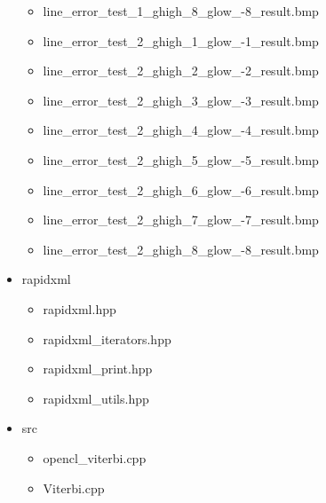 \documentclass[document.tex]{subfiles}
\begin{document}
\begin{itemize}
\begin{itemize}
        \item line\_error\_test\_1\_ghigh\_8\_glow\_-8\_result.bmp
        \item line\_error\_test\_2\_ghigh\_1\_glow\_-1\_result.bmp
        \item line\_error\_test\_2\_ghigh\_2\_glow\_-2\_result.bmp
        \item line\_error\_test\_2\_ghigh\_3\_glow\_-3\_result.bmp
        \item line\_error\_test\_2\_ghigh\_4\_glow\_-4\_result.bmp
        \item line\_error\_test\_2\_ghigh\_5\_glow\_-5\_result.bmp
        \item line\_error\_test\_2\_ghigh\_6\_glow\_-6\_result.bmp
        \item line\_error\_test\_2\_ghigh\_7\_glow\_-7\_result.bmp
        \item line\_error\_test\_2\_ghigh\_8\_glow\_-8\_result.bmp
    \end{itemize}
    \item rapidxml
    \begin{itemize}
        \item rapidxml.hpp
        \item rapidxml\_iterators.hpp
        \item rapidxml\_print.hpp
        \item rapidxml\_utils.hpp
    \end{itemize}
    \item src
    \begin{itemize}
        \item opencl\_viterbi.cpp
        \item Viterbi.cpp
    \end{itemize}
\end{itemize}
\end{document}
